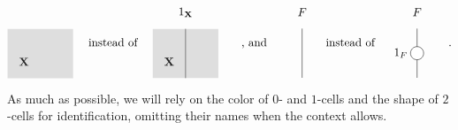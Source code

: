 \documentclass{article}
\numberwithin{equation}{section}
\theoremstyle{definition}
\newcommand{\varcat}[1]{\mathbf{#1}}
\newcommand{\cX}{\varcat{X}}
\begin{document}
	\begin{equation*}
		\begin{aligned}
			\begin{tikzpicture}
				\path (0.5,0) node {$\cX$};
				\path (1,1.5) node {$\phantom{1_{\cX}}$};						
				\fill[nearly transparent, gray] (2,-0.5) rectangle (0,1);					
			\end{tikzpicture}
		\end{aligned}
		\quad
		\text{ instead of }
		\quad
		\begin{aligned}
			\begin{tikzpicture}
				\path (0.5,0) node {$\cX$};
				\path (1,1.5) node {$1_{\cX}$};
				\draw[black] (1,1) -- (1,-0.5);
				\fill[nearly transparent, gray] (2,-0.5) rectangle (0,1);					
			\end{tikzpicture}
		\end{aligned}
		\qquad
		\text{, and }
		\qquad
		\begin{aligned}
			\begin{tikzpicture}
				\path (1,1.5) node {$F$};
				\draw[black] (1,1) -- (1,-0.5);						
			\end{tikzpicture}
		\end{aligned}
		\quad
		\text{ instead of }
		\quad
		\begin{aligned}
			\begin{tikzpicture}
				\path (1,1.5) node {$F$};

				\draw[black] (1,1) -- (1,-0.5);
				\draw[black, fill=white] (1,0.25) circle [radius=0.2];
				\path (0.5,0.25) node {$1_F$};										
			\end{tikzpicture}
		\end{aligned}		
		\qquad .
	\end{equation*}
	As much as possible, we will rely on the color of $0$- and $1$-cells and the shape of $2$-cells for identification, omitting their names when the context allows.
\end{document}
